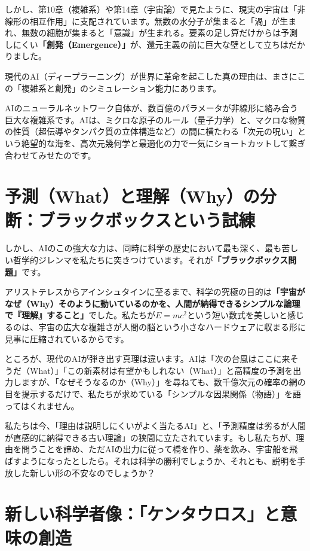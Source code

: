 しかし、第10章（複雑系）や第14章（宇宙論）で見たように、現実の宇宙は「非線形の相互作用」に支配されています。無数の水分子が集まると「渦」が生まれ、無数の細胞が集まると「意識」が生まれる。要素の足し算だけからは予測しにくい\textbf{「創発（Emergence）」}が、還元主義の前に巨大な壁として立ちはだかりました。

現代のAI（ディープラーニング）が世界に革命を起こした真の理由は、まさにこの「複雑系と創発」のシミュレーション能力にあります。

AIのニューラルネットワーク自体が、数百億のパラメータが非線形に絡み合う巨大な複雑系です。AIは、ミクロな原子のルール（量子力学）と、マクロな物質の性質（超伝導やタンパク質の立体構造など）の間に横たわる「次元の呪い」という絶望的な海を、高次元幾何学と最適化の力で一気にショートカットして繋ぎ合わせてみせたのです。

\section{予測（What）と理解（Why）の分断：ブラックボックスという試練}

しかし、AIのこの強大な力は、同時に科学の歴史において最も深く、最も苦しい哲学的ジレンマを私たちに突きつけています。それが\textbf{「ブラックボックス問題」}です。

アリストテレスからアインシュタインに至るまで、科学の究極の目的は\textbf{「宇宙がなぜ（Why）そのように動いているのかを、人間が納得できるシンプルな論理で『理解』すること」}でした。私たちが\(E=mc^2\)という短い数式を美しいと感じるのは、宇宙の広大な複雑さが人間の脳という小さなハードウェアに収まる形に見事に圧縮されているからです。

ところが、現代のAIが弾き出す真理は違います。AIは「次の台風はここに来そうだ（What）」「この新素材は有望かもしれない（What）」と高精度の予測を出力しますが、「なぜそうなるのか（Why）」を尋ねても、数千億次元の確率の網の目を提示するだけで、私たちが求めている「シンプルな因果関係（物語）」を語ってはくれません。

私たちは今、「理由は説明しにくいがよく当たるAI」と、「予測精度は劣るが人間が直感的に納得できる古い理論」の狭間に立たされています。もし私たちが、理由を問うことを諦め、ただAIの出力に従って橋を作り、薬を飲み、宇宙船を飛ばすようになったとしたら。それは科学の勝利でしょうか、それとも、説明を手放した新しい形の不安なのでしょうか？

\section{新しい科学者像：「ケンタウロス」と意味の創造}

